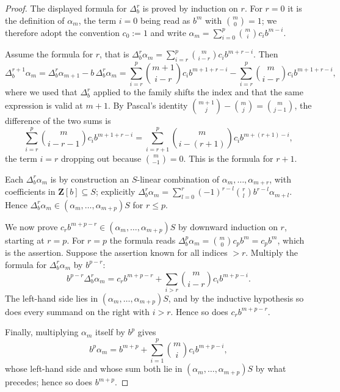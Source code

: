 \begin{proof}
The displayed formula for $\Delta_b^r$ is proved by induction on $r$.
For $r=0$ it is the definition of $\alpha_m$, the term $i=0$ being
read as $b^m$ with $\binom m0=1$; we therefore adopt the convention
$c_0:=1$ and write $\alpha_m=\sum_{i=0}^p\binom mic_ib^{m-i}$.

Assume the formula for $r$, that is
$\Delta_b^r\alpha_m=\sum_{i=r}^p\binom m{i-r}c_ib^{m+r-i}$.  Then
\[
 \Delta_b^{r+1}\alpha_m
 =\Delta_b^r\alpha_{m+1}-b\,\Delta_b^r\alpha_m
 =\sum_{i=r}^p\binom{m+1}{i-r}c_ib^{m+1+r-i}
  -\sum_{i=r}^p\binom m{i-r}c_ib^{m+1+r-i},
\]
where we used that $\Delta_b^r$ applied to the family shifts the index and
that the same expression is valid at $m+1$.  By Pascal's identity
$\binom{m+1}{j}-\binom mj=\binom m{j-1}$, the difference of the two sums
is
\[
 \sum_{i=r}^p\binom m{i-r-1}c_ib^{m+1+r-i}
 =\sum_{i=r+1}^p\binom m{i-(r+1)}c_ib^{m+(r+1)-i},
\]
the term $i=r$ dropping out because $\binom m{-1}=0$.  This is the
formula for $r+1$.

Each $\Delta_b^r\alpha_m$ is by construction an $S$-linear combination
of $\alpha_m,\ldots,\alpha_{m+r}$, with coefficients in
$\mathbf Z[b]\subseteq S$; explicitly
$\Delta_b^r\alpha_m=\sum_{l=0}^r(-1)^{r-l}\binom rl b^{r-l}\alpha_{m+l}$.
Hence $\Delta_b^r\alpha_m\in(\alpha_m,\ldots,\alpha_{m+p})S$ for
$r\le p$.

We now prove $c_rb^{m+p-r}\in(\alpha_m,\ldots,\alpha_{m+p})S$ by downward
induction on $r$, starting at $r=p$.  For $r=p$ the formula reads
$\Delta_b^p\alpha_m=\binom m0c_pb^m=c_pb^m$, which is the assertion.
Suppose the assertion known for all indices $>r$.  Multiply the formula
for $\Delta_b^r\alpha_m$ by $b^{p-r}$:
\[
 b^{p-r}\Delta_b^r\alpha_m
 =c_rb^{m+p-r}+\sum_{i>r}\binom m{i-r}c_ib^{m+p-i}.
\]
The left-hand side lies in $(\alpha_m,\ldots,\alpha_{m+p})S$, and by the
inductive hypothesis so does every summand on the right with $i>r$.
Hence so does $c_rb^{m+p-r}$.

Finally, multiplying $\alpha_m$ itself by $b^p$ gives
\[
 b^p\alpha_m=b^{m+p}+\sum_{i=1}^p\binom mic_ib^{m+p-i},
\]
whose left-hand side and whose sum both lie in
$(\alpha_m,\ldots,\alpha_{m+p})S$ by what precedes; hence so does
$b^{m+p}$.
\end{proof}

